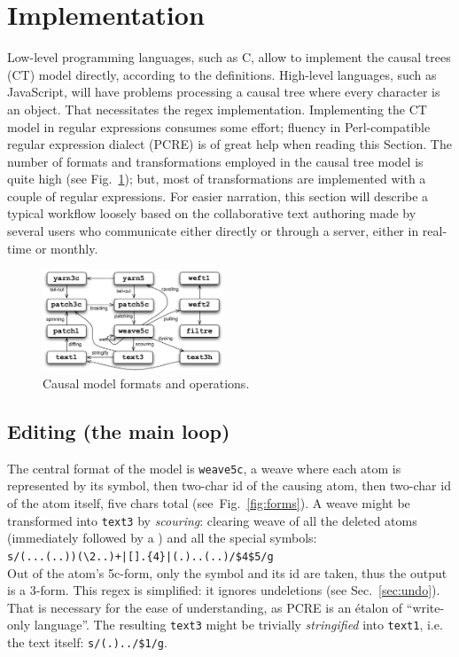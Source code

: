 \documentclass{sig-alternate}
\begin{document}
\section{Implementation}	   \label{sec:algos}

Low-level programming languages, such as C, allow to implement the  causal trees (CT) model directly, according to the definitions.
High-level languages, such as JavaScript, will have problems processing a causal tree where every character is an object.
That necessitates the regex implementation.
Implementing the CT model in regular expressions consumes some effort; fluency in Perl-compatible regular expression dialect (PCRE) is of great help when reading this Section. 
The number of formats and transformations employed in the causal tree model is quite high (see Fig.~\ref{fig:ops}); but, most of transformations are implemented with a couple of regular expressions. 
For easier narration, this section will describe a typical workflow loosely based on the collaborative text authoring made by several users who communicate either directly or through a server, either in real-time or monthly.

\begin{figure}[t] \label{fig:ops}
\includegraphics[width=0.48\textwidth]{operations.pdf}
\caption{Causal model formats and operations.} \label{fig:ops}
\end{figure}

\subsection{Editing (the main loop)}

The central format of the model is {\tt weave5c}, a weave where each atom is represented by its symbol, then two-char id of the causing atom, then two-char id of the atom itself, five chars total (see~Fig.~\ref{fig:forms}).
A weave might be transformed into {\tt text3} by \emph{scouring}: clearing weave of all the deleted atoms (immediately followed by a \bsp) and all the special symbols: \\
{\small \verb`s/(...(..))(`\bsp\verb`\2..)+|[`\bsp\zero\cnc\verb`].{4}|(.)..(..)/$4$5/g`}\\
Out of the atom's 5c-form, only the symbol and its id are taken, thus the output is a 3-form.
This regex is simplified: it ignores undeletions (see Sec.~\ref{sec:undo}).
That is necessary for the ease of understanding, as PCRE is an étalon of ``write-only language''. 
The resulting {\tt text3} might be trivially \emph{stringified} into {\tt text1}, i.e. the text itself: {\small \verb+s/(.)../$1/g+}.
\end{document}
